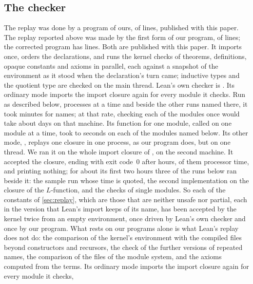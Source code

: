 \subsection{The checker}\label{sec:checker}
\ifsecondrun
The replay was done by a program of ours, of \replayprogramlines{} lines, published with this
paper.
\else
The replay reported above was made by the first form of our program, of \firstprogramlines{}
lines; the corrected program has \replayprogramlines{} lines. Both are published with this
paper.
\fi
It imports once, orders the declarations, and runs the kernel checks of theorems,
definitions, opaque constants and axioms in parallel, each against a snapshot of the
environment as it stood when the declaration's turn came; inductive types and the quotient
type are checked on the main thread. Lean's own checker is 
\cite{lean4checker}.
\ifsecondrun
Its ordinary mode imports the import closure again for every module it
checks. Run as described below, \stocksampleatatime{} processes at a time and beside the
other runs named there, it took \stocksampleminutes{} minutes for \stocksample{} names; at
that rate, checking each of the \filecount{} modules once would take about \stockfulldays{}
days on that machine. Its function for one module, called on one module at a time, took
\stockexactmin{} to \stockexactmax{} seconds on each of the \stockkilledimports{} modules
named below. Its other mode,
, replays one closure in one process, as our program does, but on one thread.
We ran it on the whole import closure of , on the second machine. It accepted the
closure, ending with exit code~$0$ after \freshmainhours{} hours, \freshmaincpuhours{} of
them processor time, and printing nothing; for about its first two hours three of the runs
below ran beside it: the sample run whose time is quoted, the second implementation on the
closure of the $L$-function, and the checks of single modules. So each of the
\replaydecls{} constants of \cref{sec:replay}, which are those that are neither unsafe nor
partial, each in the version that Lean's import keeps of its name, has been accepted by the
kernel twice from an empty environment, once driven by Lean's own checker and once by our
program. What rests on our programs alone is what Lean's replay does not do: the comparison
of the kernel's environment with the compiled files beyond constructors and recursors, the
check of the further versions of repeated names, the comparison of the files of the module
system, and the axioms computed from the terms.
\else
Its ordinary mode imports the import closure again for every module it checks, \filecount{}
